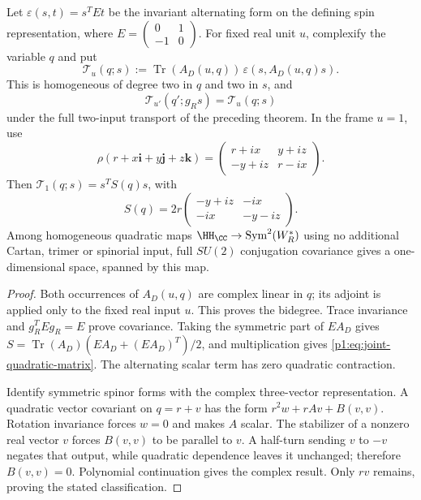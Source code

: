 \documentclass[11pt]{article}
\begin{document}
\begin{theorem}
\label{p1:thm:hopf-hurwitz-quadratic-comparison}
Let \(\varepsilon(s,t)=s^TEt\) be the invariant alternating form on the
defining spin representation, where
\(E=\left(\begin{smallmatrix}0&1\\-1&0\end{smallmatrix}\right)\).
For fixed real unit \(u\), complexify the variable \(q\) and put
\[
 \mathcal T_u(q;s)
 :=\operatorname{Tr}(A_D(u,q))\,\varepsilon(s,A_D(u,q)s).
\]
This is homogeneous of degree two in \(q\) and two in \(s\), and
\[
 \mathcal T_{u'}(q';g_Rs)=\mathcal T_u(q;s)
\]
under the full two-input transport of the preceding theorem.  In the frame
\(u=1\), use
\[
 \rho(r+x\mathbf i+y\mathbf j+z\mathbf k)
 =\begin{pmatrix}r+ix&y+iz\\-y+iz&r-ix\end{pmatrix}.
\]
Then \(\mathcal T_1(q;s)=s^TS(q)s\), with
\begin{equation}
\label{p1:eq:joint-quadratic-matrix}
 S(q)=2r\begin{pmatrix}-y+iz&-ix\\-ix&-y-iz\end{pmatrix}.
\end{equation}
Among homogeneous quadratic maps
\(\HH_{\CC}\to\operatorname{Sym}^2(W_R^*)\) using no additional
Cartan, trimer or spinorial input, full \(SU(2)\) conjugation covariance
gives a one-dimensional space, spanned by this map.
\end{theorem}

\begin{proof}
Both occurrences of \(A_D(u,q)\) are complex linear in \(q\); its adjoint
is applied only to the fixed real input \(u\).  This proves the bidegree.
Trace invariance and \(g_R^TEg_R=E\) prove covariance.  Taking the
symmetric part of \(EA_D\) gives
\(S=\operatorname{Tr}(A_D)(EA_D+(EA_D)^T)/2\), and multiplication gives
\eqref{p1:eq:joint-quadratic-matrix}.  The alternating scalar term has
zero quadratic contraction.

Identify symmetric spinor forms with the complex three-vector representation.
A quadratic vector covariant on \(q=r+v\) has the form
\(r^2w+rAv+B(v,v)\).  Rotation invariance forces \(w=0\) and makes
\(A\) scalar.  The stabilizer of a nonzero real vector \(v\) forces
\(B(v,v)\) to be parallel to \(v\).  A half-turn sending \(v\) to
\(-v\) negates that output, while quadratic dependence leaves it unchanged;
therefore \(B(v,v)=0\).  Polynomial continuation gives the complex result.
Only \(rv\) remains, proving the stated classification.
\end{proof}
\end{document}

